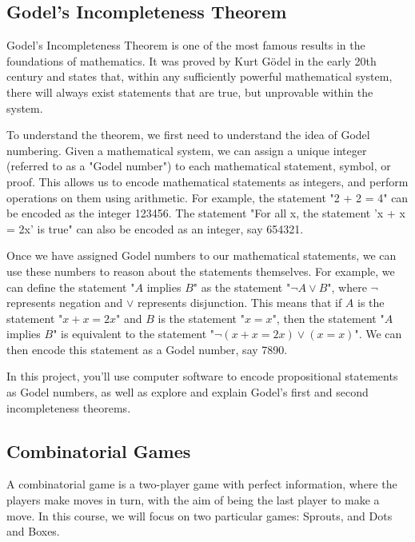 \documentclass{article}
\begin{document}
\pagebreak 

\subsection*{Godel's Incompleteness Theorem}

Godel's Incompleteness Theorem is one of the most famous results in the foundations of mathematics. It was proved by Kurt Gödel in the early 20th century and states that, within any sufficiently powerful mathematical system, there will always exist statements that are true, but unprovable within the system.

\vspace{3mm}
To understand the theorem, we first need to understand the idea of Godel numbering. Given a mathematical system, we can assign a unique integer (referred to as a "Godel number") to each mathematical statement, symbol, or proof. This allows us to encode mathematical statements as integers, and perform operations on them using arithmetic. For example, the statement "2 + 2 = 4" can be encoded as the integer 123456. The statement "For all x, the statement 'x + x = 2x' is true" can also be encoded as an integer, say 654321.

\vspace{3mm}
Once we have assigned Godel numbers to our mathematical statements, we can use these numbers to reason about the statements themselves. For example, we can define the statement "$A$ implies $B$" as the statement "$\neg A \vee B$", where $\neg$ represents negation and $\vee$ represents disjunction. This means that if $A$ is the statement "$x + x = 2x$" and $B$ is the statement "$x = x$", then the statement "$A$ implies $B$" is equivalent to the statement "$\neg(x + x = 2x) \vee (x = x)$". We can then encode this statement as a Godel number, say 7890.

\vspace{3mm}
In this project, you'll use computer software to encode propositional statements as Godel numbers, as well as explore and explain Godel's first and second incompleteness theorems.

\pagebreak 

\subsection*{Combinatorial Games}
A combinatorial game is a two-player game with perfect information, where the players make moves in turn, with the aim of being the last player to make a move. In this course, we will focus on two particular games: Sprouts, and Dots and Boxes.
\end{document}
